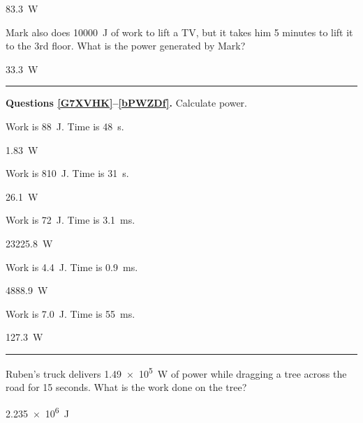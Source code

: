 \documentclass[]{exam}
\begin{document}
\begin{questions}
\begin{solution}
\SI{83.3}{W}
\end{solution}

\question \label{vJllNv}
Mark also does \SI{10000}{J} of work to lift a TV, but it takes him 5 minutes to lift it to the 3rd floor. What is the power generated by Mark?

\begin{solution}
\SI{33.3}{W}
\end{solution}

\bigskip
\hrule

\begin{EnvUplevel}
    \textbf{Questions \ref{G7XVHK}--\ref{bPWZDf}.} Calculate power.
\end{EnvUplevel}


\question \label{G7XVHK}
Work is \SI{88}{J}. Time is \SI{48}{s}.

\begin{solution}
\SI{1.83}{W}
\end{solution}

\question \label{CJRoQV}
Work is \SI{810}{J}. Time is \SI{31}{s}.

\begin{solution}
\SI{26.1}{W}
\end{solution}


\question \label{AORjkH}
Work is \SI{72}{J}. Time is \SI{3.1}{ms}.

\begin{solution}
\SI{23225.8}{W}
\end{solution}


\question \label{iKHe2E}
Work is \SI{4.4}{J}. Time is \SI{0.9}{ms}.

\begin{solution}
\SI{4888.9}{W}
\end{solution}


\question \label{bPWZDf}
Work is \SI{7.0}{J}. Time is \SI{55}{ms}.

\begin{solution}
\SI{127.3}{W}
\end{solution}

\bigskip
\hrule


\question \label{RvNudw}
Ruben's truck delivers \SI{1.49e5}{W} of power while dragging a tree across the road for 15 seconds. What is the work done on the tree?

\begin{solution}
\SI{2.235e6}{J}
\end{solution}


\end{questions}
\end{document}
